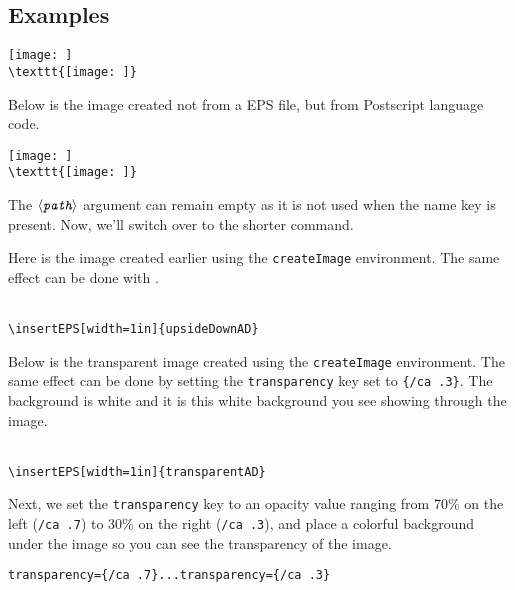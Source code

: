 \documentclass{article}
\def\anglemeta#1{$\langle\textit{\texttt{#1}}\rangle$}
\def\meta#1{\textit{\texttt{#1}}}
\let\meta\anglemeta
\begin{document}
\subsection{Examples}


\begin{center}
\texttt{[image: ]}\\
\small\verb!\texttt{[image: ]}!
\end{center}

Below is the image created not from a EPS file, but from Postscript language code.

\begin{center}
\texttt{[image: ]}\\
\small\verb!\texttt{[image: ]}!
\end{center}

The \meta{path} argument can remain empty as it is not used when the name key is
present. Now, we'll switch over to the shorter  command.

Here is the image created earlier using the \texttt{createImage} environment. The same effect
can be done with .

\begin{center}
\\
\verb!\insertEPS[width=1in]{upsideDownAD}!
\end{center}

Below is the transparent image created using the \texttt{createImage} environment. The same effect
can be done by setting the \texttt{transparency} key set to \verb!{/ca .3}!. The background is white
and it is this white background you see showing through the image.

\begin{center}
\\
\verb!\insertEPS[width=1in]{transparentAD}!
\end{center}



Next, we set the \texttt{transparency} key to an opacity value ranging from 70\% on the left (\texttt{/ca .7})
to 30\% on the right (\texttt{/ca .3}), and place a colorful background under the
image so you can see the transparency of the image.

\begin{center}\previewfalse
{} %
\small\verb!transparency={/ca .7}...transparency={/ca .3}!
\end{center}
\end{document}
